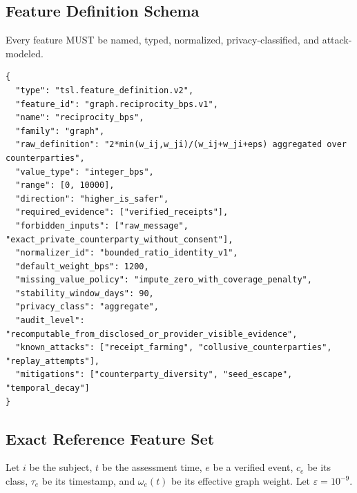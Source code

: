 \documentclass[11pt]{article}
\begin{document}
\subsection{Feature Definition Schema}

Every feature MUST be named, typed, normalized, privacy-classified, and attack-modeled.

\begin{lstlisting}[style=tslcode]
{
  "type": "tsl.feature_definition.v2",
  "feature_id": "graph.reciprocity_bps.v1",
  "name": "reciprocity_bps",
  "family": "graph",
  "raw_definition": "2*min(w_ij,w_ji)/(w_ij+w_ji+eps) aggregated over counterparties",
  "value_type": "integer_bps",
  "range": [0, 10000],
  "direction": "higher_is_safer",
  "required_evidence": ["verified_receipts"],
  "forbidden_inputs": ["raw_message", "exact_private_counterparty_without_consent"],
  "normalizer_id": "bounded_ratio_identity_v1",
  "default_weight_bps": 1200,
  "missing_value_policy": "impute_zero_with_coverage_penalty",
  "stability_window_days": 90,
  "privacy_class": "aggregate",
  "audit_level": "recomputable_from_disclosed_or_provider_visible_evidence",
  "known_attacks": ["receipt_farming", "collusive_counterparties", "replay_attempts"],
  "mitigations": ["counterparty_diversity", "seed_escape", "temporal_decay"]
}
\end{lstlisting}

\subsection{Exact Reference Feature Set}

Let \(i\) be the subject, \(t\) be the assessment time, \(e\) be a verified event, \(c_e\) be its class, \(\tau_e\) be its timestamp, and \(\omega_e(t)\) be its effective graph weight. Let \(\varepsilon=10^{-9}\).
\end{document}
